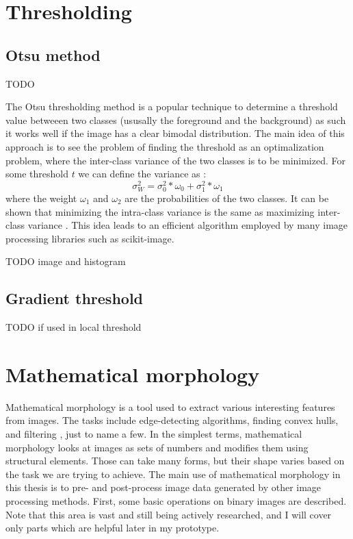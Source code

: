 \documentclass[
  digital,     %
  oneside,     %
  nosansbold,  %
  nocolorbold, %
  lof,         %
  lot,         %
]{fithesis4}
\begin{document}
\section{Thresholding}

\subsection{Otsu method}

TODO \parencite{otsu1979}

The Otsu thresholding method is a popular technique to determine a threshold
value betweeen two classes (ususally the foreground and the background) as such
it works well if the image has a clear bimodal distribution. The main idea of
this approach is to see the problem of finding the threshold as an
optimalization problem, where the inter-class variance of the two classes is to
be minimized. For some threshold $t$ we can define the variance as
\parencite{otsu1979}:
$$\sigma^2_W = \sigma^2_0 * \omega_0 + \sigma^2_1 * \omega_1$$  %
where the weight $\omega_1$ and $\omega_2$ are the probabilities of the two classes. It
can be shown that minimizing the intra-class variance is the same as maximizing
inter-class variance \parencite{otsu1979}. This idea leads to an efficient
algorithm employed by many image processing libraries such as scikit-image.

TODO image and histogram

\subsection{Gradient threshold}

 TODO if used in local threshold

\section{Mathematical morphology}

Mathematical morphology is a tool used to extract various interesting features
from images. The tasks include edge-detecting algorithms, finding convex hulls, and filtering 
, just to name a few. In the simplest terms,
mathematical morphology looks at images as sets of numbers and modifies them using structural elements. Those can take many forms, but their shape varies based on the task we are trying
to achieve. The main use of mathematical morphology in this thesis is
to pre- and post-process image data generated by other image processing methods.
First, some basic operations on binary images are described. Note that
this area is vast and still being actively researched, and I will cover only parts which are helpful later in my
prototype.
\end{document}
